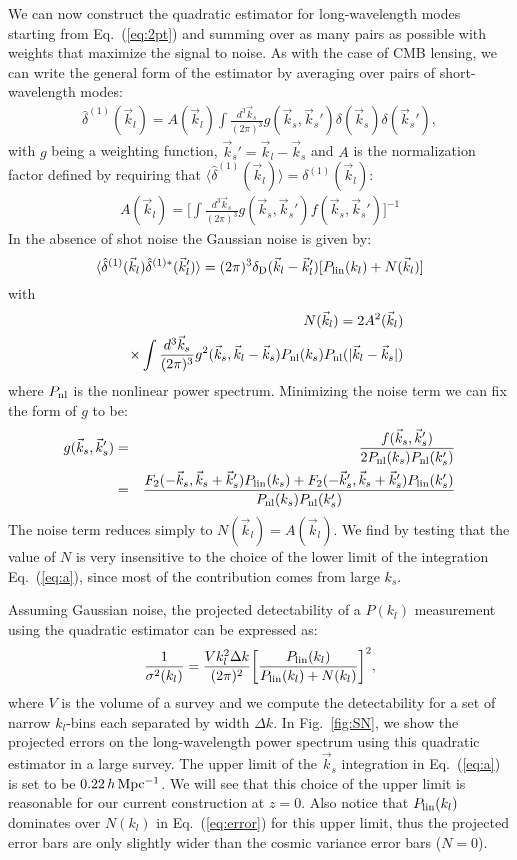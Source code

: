 \documentclass[prd,amsmath,amssymb,floatfix,superscriptaddress,nofootinbib,twocolumn]{revtex4-1}
\def\be{\begin{equation}}
\def\ee{\end{equation}}
\newcommand{\vs}{\nonumber\\}
\newcommand{\vk}{\vec{k}}
\newcommand{\ec}[1]{Eq.~(\ref{eq:#1})}
\newcommand{\eql}[1]{\label{eq:#1}}
\newcommand{\rf}[1]{\ref{fig:#1}}
\newcommand{\peikai}[1]{{\color{blue} #1}}
\begin{document}
\label{sec2}
We can now construct the quadratic estimator for long-wavelength modes starting from \ec{2pt} and summing over as many pairs as possible with weights that maximize the signal to noise. As with the case of CMB lensing, we can write the general form of the estimator by averaging over pairs of short-wavelength modes:
\begin{eqnarray}
\hat{\delta}^{(1)}(\vec{k}_l)=A(\vec{k}_l)\int \frac{d^3 \vec{k}_s}{(2\pi)^3} g(\vec{k}_s,\vec{k}_s'){\delta}(\vec{k}_s){\delta}(\vec{k}_s') \eql{quadest},
\end{eqnarray} 
with $g$ being a weighting function, $\vk_s'=\vk_l-\vk_s$ and $A$ \peikai{is the normalization factor} defined by requiring that $\langle \hat{\delta}^{(1)}(\vec{k}_l) \rangle={\delta}^{(1)}(\vec{k}_l)$:
\begin{eqnarray}
A(\vec{k}_l)=\bigg[\int \frac{d^3 \vec{k}_s}{(2\pi)^3} g(\vec{k}_s,\vec{k}_s')f(\vec{k}_s,\vec{k}_s')  \bigg]^{-1} \eql{a}
\end{eqnarray}
In the absence of shot noise the Gaussian noise is given by:
\be 
\langle \hat{\delta}^{(1)}(\vk_{l})\hat{\delta}^{(1)*}(\vk_{l}') \rangle = (2\pi)^3 \delta_{\rm D}(\vk_{l}-\vk_{l}')[P_{\rm lin}(k_{l})+N(\vk_l)]
\ee 
with 
\begin{eqnarray}
&&N(\vec{k}_{l})=2A^2(\vk_{l})\vs
&&\times\int \frac{d^3 \vec{k}_{s}}{(2\pi)^3} g^2(\vec{k}_{s},\vk_l-\vec{k}_{s})P_{\rm nl}(k_{s})P_{\rm nl}(|\vk_l-\vk_s|)
\end{eqnarray}
where $P_{\rm nl}$ is the nonlinear power spectrum. Minimizing the noise term we can fix the form of $g$ to be:
\begin{eqnarray}
g(\vec{k}_{s},\vec{k}_{s}')
&=&\frac{f(\vec{k}_{s},\vec{k}_{s}')}{2P_{\rm nl}(k_{s})P_{\rm nl}(k_{s}')}\vs
&=&\frac{F_2(-\vec{k}_s,\vec{k}_s+\vec{k}_s')P_{\rm lin}(k_s)+F_2(-\vec{k}_s',\vec{k}_s+\vec{k}_s')P_{\rm lin}(k_s')}{P_{\rm nl}(k_{s})P_{\rm nl}(k_{s}')}\vs 
\end{eqnarray} 
The noise term reduces simply to $N(\vk_l)=A(\vk_l)$. We find by testing that the value of $N$ is very insensitive to the choice of the lower limit of the integration \ec{a}, since most of the contribution comes from large $k_s$. 

Assuming Gaussian noise, the projected detectability of a $P(k_l)$ measurement using the quadratic estimator can be expressed as:
\be
\frac{1}{\sigma^{2}(k_l)}=\frac{V k_l^2 \Delta k }{(2\pi)^2}\bigg[\frac{P_{\rm lin}(k_l)}{P_{\rm lin}(k_l)+N(k_l) }\bigg]^2 \eql{error},
\ee
where $V$ is the volume of a survey and we compute the detectability for a set of narrow $k_l$-bins each separated by width $\Delta k$.
In Fig.~\rf{SN}, we show the projected errors on the long-wavelength power spectrum using this quadratic estimator in a large survey. The upper limit of the $\vk_s$ integration in \ec{a} is set to be $0.22\,h\,\rm Mpc^{-1}$. We will see that this choice of the upper limit is reasonable for our current construction at $z=0$. Also notice that $P_{\rm lin}(k_l)$ dominates over $N(k_l)$ in \ec{error} for this upper limit, thus the projected error bars are only slightly wider than the cosmic variance error bars ($N=0$).
\end{document}

